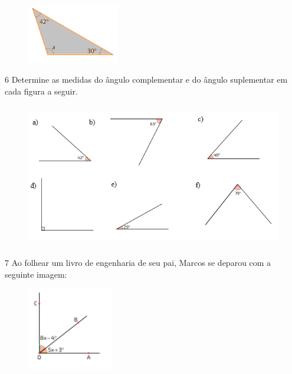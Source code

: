 {{{\begin{escolha}
\begin{figure}[H]
\end{figure}
\item
\begin{figure}[H]
\centering\includegraphics[width=4cm]{./imgSAEB_8_MAT/media/image29.png}
\end{figure}
\end{escolha}








\num{6} Determine as medidas do ângulo complementar e do ângulo suplementar
em cada figura a seguir.

\begin{figure}[H]
\centering\includegraphics[width=4.81667in,height=2.48373in]{./imgSAEB_8_MAT/media/image30.png}
\end{figure}


\num{7} Ao folhear um livro de engenharia de seu pai, Marcos se deparou com a
seguinte imagem:

\begin{figure}[H]
\centering\includegraphics[width=1.47134in,height=1.42708in]{./imgSAEB_8_MAT/media/image31.png}
\end{figure}

}}}
